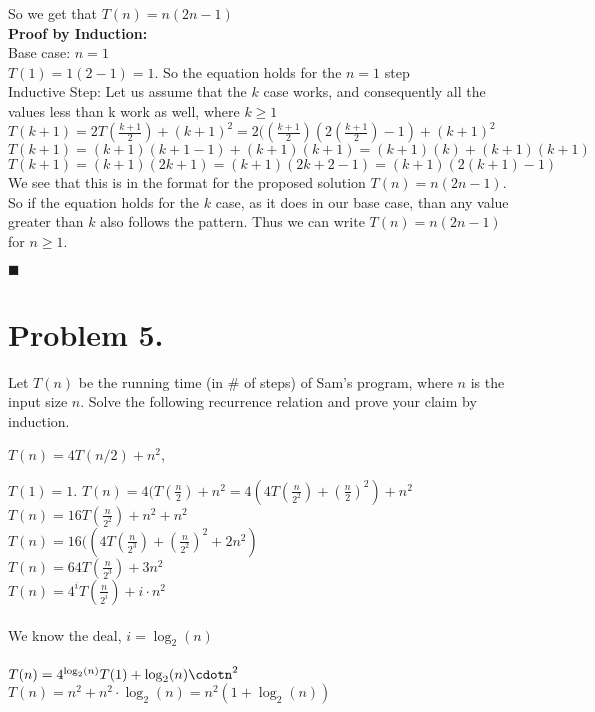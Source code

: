 \documentclass[11pt]{article}
\begin{document}
So we get that $\boxed{T(n) = n(2n-1)}$\\

{\bf Proof by Induction:}\\

Base case: $n=1$\\
$T(1) = 1(2-1)=1$. So the equation holds for the $n=1$ step\\

Inductive Step: Let us assume that the $k$ case works, and consequently all the values less than k work as well, where $k\geq 1$\\
$T(k+1) = 2T(\frac{k+1}{2}) + (k+1)^2 = 2((\frac{k+1}{2})(2(\frac{k+1}{2})-1)+(k+1)^2$\\
$T(k+1) = (k+1)(k+1-1) + (k+1)(k+1) = (k+1)(k) + (k+1)(k+1)$\\
$T(k+1) = (k+1)(2k+1) = (k+1)(2k+2 -1) = (k+1)(2(k+1) -1)$\\

We see that this is in the format for the proposed solution $T(n) = n(2n-1)$. So if the equation holds for the $k$ case, as it does in our base case, than any value greater than $k$ also follows the pattern. Thus we can write $\boxed{T(n) = n(2n-1)}$ for $n\geq 1$.
\begin{flushright}$\blacksquare$\end{flushright}


\newpage


\section*{Problem 5.}

Let $T(n)$ be the running time (in \# of steps) of Sam's program, where $n$ is the input size $n$.
Solve the following recurrence relation and prove your claim by induction.
\newline

$T(n)=4T(n/2)+n^2$,

$T(1)=1$.
\newline
\newline
\noindent
    $T(n) = 4(T(\frac{n}{2})+n^2 = 4(4T(\frac{n}{2^2}) + (\frac{n}{2})^2) +n^2$\\
    $T(n) = 16T(\frac{n}{2^2}) + n^2 + n^2$\\
    $T(n)=16((4T(\frac{n}{2^3})+(\frac{n}{2^2})^2 + 2n^2)$\\
    $T(n)= 64T(\frac{n}{2^3}) + 3n^2$\\
    $T(n)= 4^i T(\frac{n}{2^i}) + i\cdot n^2$\\\\
We know the deal, $i = \log_2(n)$\\\\
$T(n) = 4^{\log_2(n)} T(1) + \log_2(n)\cdotn^2$\\
$T(n) = n^2 + n^2 \cdot \log_2(n) = n^2(1+\log_2(n))$\\
\end{document}
